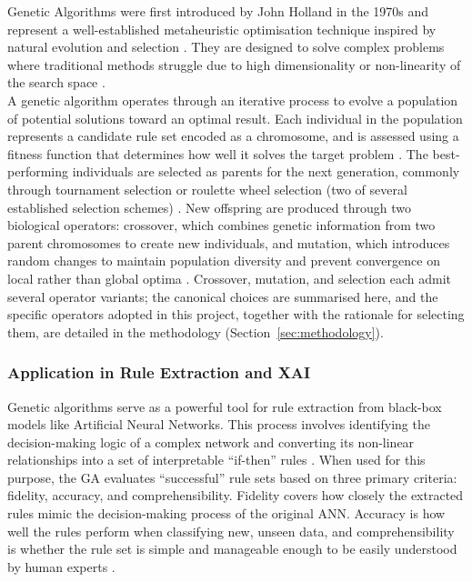\label{ssub:ga}

Genetic Algorithms were first introduced by John Holland in the 1970s \cite{Holland1975} and represent
a well-established metaheuristic optimisation technique inspired by natural evolution and selection
\cite{Yedjour2024}. They are designed to solve complex problems where traditional methods struggle due
to high dimensionality or non-linearity of the search space \cite{Yedjour2024}.
\\
A genetic algorithm operates through an iterative process to evolve a population of potential solutions
toward an optimal result. Each individual in the population represents a candidate rule set encoded as a
chromosome, and is assessed using a fitness function that determines how well it solves the target
problem \cite{Yedjour2024}. The best-performing individuals are selected as parents for the next
generation, commonly through tournament selection or roulette wheel selection (two of several
established selection schemes) \cite{Yedjour2024}. New offspring are produced through two biological
operators: crossover, which combines genetic information from two parent chromosomes to create new
individuals, and mutation, which introduces random changes to maintain population diversity and prevent
convergence on local rather than global optima \cite{Yedjour2024}. Crossover, mutation, and selection
each admit several operator variants; the canonical choices are summarised here, and the specific
operators adopted in this project, together with the rationale for selecting them, are detailed in the
methodology (Section~\ref{sec:methodology}).

\subsubsection{Application in Rule Extraction and XAI}
\label{ssub:ga-rule-extraction}

Genetic algorithms serve as a powerful tool for rule extraction from black-box models like Artificial
Neural Networks. This process involves identifying the decision-making logic of a complex network and
converting its non-linear relationships into a set of interpretable ``if-then'' rules \cite{Yedjour2024}.
When used for this purpose, the GA evaluates ``successful'' rule sets based on three primary criteria:
fidelity, accuracy, and comprehensibility. Fidelity covers how closely the extracted rules mimic the
decision-making process of the original ANN. Accuracy is how well the rules perform when classifying
new, unseen data, and comprehensibility is whether the rule set is simple and manageable enough to be
easily understood by human experts \cite{Yedjour2024}.